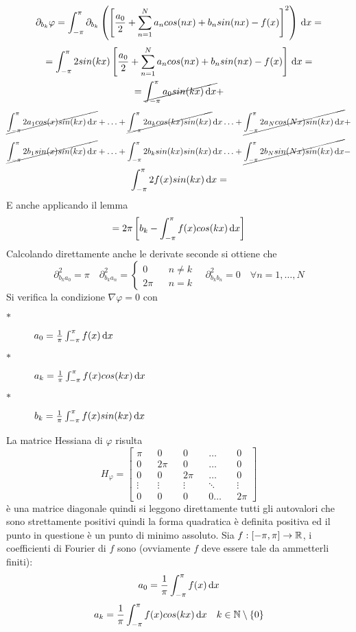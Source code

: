 $$\partial_{b_k}\varphi = \int_{-\pi}^{\pi}\partial_{b_k}\left(\left[\frac{a_0}{2}+\sum\limits_{n=1}^{N}a_{n}cos(nx)+b_{n}sin(nx)-f(x)\right]^2\right)\,\mathrm{d}{x}=$$
$$ = \int_{-\pi}^{\pi} 2sin(kx) \left[\frac{a_0}{2}+\sum\limits_{n=1}^{N}a_{n}cos(nx)+b_{n}sin(nx)-f(x)\right]\,\mathrm{d}{x}=$$
$$ =  \cancel{\int_{-\pi}^{\pi} a_0sin(kx)\,\mathrm{d}{x}} + $$
$$\cancel{\int_{-\pi}^{\pi} 2a_1cos(x)sin(kx)\,\mathrm{d}{x}} +
\ldots + 
\cancel{\int_{-\pi}^{\pi} 2a_kcos(kx)sin(kx)}\,\mathrm{d}{x}
\ldots + 
\cancel{\int_{-\pi}^{\pi} 2a_Ncos(Nx)sin(kx)\,\mathrm{d}{x}} + $$
$$\cancel{\int_{-\pi}^{\pi} 2b_1sin(x)sin(kx)\,\mathrm{d}{x}} +
\ldots + 
\int_{-\pi}^{\pi} 2b_ksin(kx)sin(kx)\,\mathrm{d}{x}
\ldots + 
\cancel{\int_{-\pi}^{\pi} 2b_Nsin(Nx)sin(kx)\,\mathrm{d}{x}} - $$
$$\int_{-\pi}^{\pi} 2f(x)sin(kx)\,\mathrm{d}{x} = $$
E anche applicando il lemma
$$=2\pi\left[b_k-\int_{-\pi}^{\pi}f(x)cos(kx)\,\mathrm{d}{x}\right]$$
Calcolando direttamente anche le derivate seconde si ottiene che
$$\partial^2_{b_ka_0}=\pi\quad\partial^2_{b_ka_n}=
\left\{\begin{matrix}
0&&n\ne k\\2\pi&&n=k
\end{matrix}\right.
\quad\partial^2_{b_kb_n}=0\quad\forall n=1,\ldots,N$$
Si verifica la condizione $\nabla\varphi = 0$ con
\begin{description}
	\item[$\ast$] $a_0=\frac{1}{\pi}\int_{-\pi}^{\pi}f(x)\,\mathrm{d}{x}$
	\item[$\ast$] $a_k=\frac{1}{\pi}\int_{-\pi}^{\pi}f(x)cos(kx)\,\mathrm{d}{x}$
	\item[$\ast$] $b_k=\frac{1}{\pi}\int_{-\pi}^{\pi}f(x)sin(kx)\,\mathrm{d}{x}$
\end{description}
La matrice Hessiana di $\varphi$ risulta $$H_{\varphi}=\left[\begin{matrix}
\pi&&0&&0&&\ldots&&0\\
0&&2\pi&&0&&\ldots&&0\\
0&&0&&2\pi&&\ldots&&0\\
\vdots&&\vdots&&\vdots&&\ddots&&\vdots\\
0&&0&&0&&0\ldots&&2\pi
\end{matrix}\right]$$
è una matrice diagonale quindi si leggono direttamente tutti gli autovalori che sono strettamente positivi quindi la forma quadratica è definita positiva ed il punto in questione è un punto di minimo assoluto.
Sia $f:\left[-\pi,\pi\right]\to \mathbb{R}$, i coefficienti di Fourier di $f$ sono (ovviamente $f$ deve essere tale da ammetterli finiti):
$$a_0=\frac{1}{\pi}\int_{-\pi}^{\pi}f(x)\,\mathrm{d}{x}$$
$$a_k=\frac{1}{\pi}\int_{-\pi}^{\pi}f(x)cos(kx)\,\mathrm{d}{x}\quad k\in\mathbb{N}\setminus{\left\{0\right\}}$$
